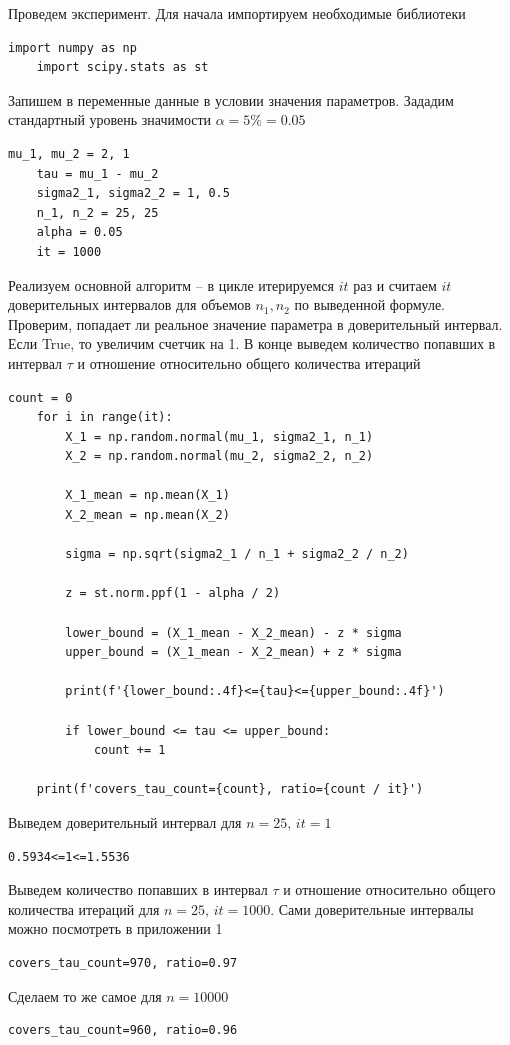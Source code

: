 \documentclass[a4paper, 12pt]{article}
\begin{document}
    Проведем эксперимент. Для начала импортируем необходимые библиотеки
    \begin{lstlisting}[label=imps1, caption={Импортирование необходимых библиотек}]
    import numpy as np
    import scipy.stats as st
    \end{lstlisting}
    Запишем в переменные данные в условии значения параметров. Зададим стандартный уровень значимости $\alpha=5\%=0.05$
    \begin{lstlisting}[label=vars, caption={Задаем данные по условию}]
    mu_1, mu_2 = 2, 1
    tau = mu_1 - mu_2
    sigma2_1, sigma2_2 = 1, 0.5
    n_1, n_2 = 25, 25
    alpha = 0.05
    it = 1000
    \end{lstlisting}
    Реализуем основной алгоритм -- в цикле итерируемся $it$ раз и считаем $it$ доверительных интервалов для объемов $n_1,n_2$ по выведенной формуле.
    Проверим, попадает ли реальное значение параметра в доверительный интервал. Если True, то увеличим счетчик на 1. В конце
    выведем количество попавших в интервал $\tau$ и отношение относительно общего количества итераций
    \begin{lstlisting}[label=code1, caption={Код для подсчета доверительных интервалов и кол-ва попаданий}]
    count = 0
    for i in range(it):
        X_1 = np.random.normal(mu_1, sigma2_1, n_1)
        X_2 = np.random.normal(mu_2, sigma2_2, n_2)
        
        X_1_mean = np.mean(X_1)
        X_2_mean = np.mean(X_2)
        
        sigma = np.sqrt(sigma2_1 / n_1 + sigma2_2 / n_2)
        
        z = st.norm.ppf(1 - alpha / 2)
        
        lower_bound = (X_1_mean - X_2_mean) - z * sigma
        upper_bound = (X_1_mean - X_2_mean) + z * sigma

        print(f'{lower_bound:.4f}<={tau}<={upper_bound:.4f}')
            
        if lower_bound <= tau <= upper_bound:
            count += 1
        
    print(f'covers_tau_count={count}, ratio={count / it}')
    \end{lstlisting}


    Выведем доверительный интервал для $n=25,\,it=1$
    \begin{lstlisting}[label=res1, caption={Посчитанный доверительный интервал}]
    0.5934<=1<=1.5536
    \end{lstlisting}
    Выведем количество попавших в интервал $\tau$ и отношение относительно общего количества итераций
    для $n=25,\,it=1000$. Сами доверительные интервалы можно посмотреть в приложении 1
    \begin{lstlisting}[label=n25, caption={95-\% доверительный интервал для $n=25$}]
    covers_tau_count=970, ratio=0.97
    \end{lstlisting}
    Сделаем то же самое для $n=10000$
    \begin{lstlisting}[label=n10000, caption={95-\% доверительный интервал для $n=10000$}]
    covers_tau_count=960, ratio=0.96
    \end{lstlisting}
\end{document}
